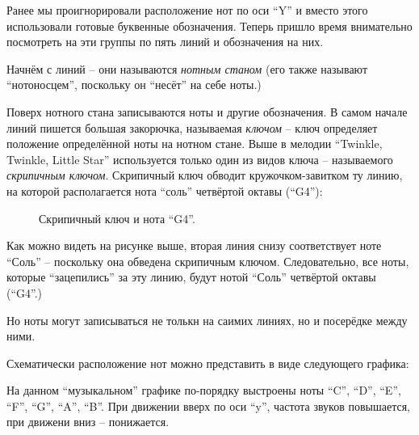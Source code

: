 \documentclass[a4paper,twoside]{book}
\begin{document}
Ранее мы проигнорировали расположение нот по оси ``Y'' и вместо этого
использовали готовые буквенные обозначения. Теперь пришло время внимательно
посмотреть на эти группы по пять линий и обозначения на них.

Начнём с линий -- они называются \emph{нотным станом} (его также называют
``нотоносцем'', поскольку он ``несёт'' на себе ноты.)

Поверх нотного стана записываются ноты и другие обозначения. В самом начале
линий пишется большая закорючка, называемая \emph{ключом} -- ключ определяет
положение определённой ноты на нотном стане. Выше в мелодии ``Twinkle, Twinkle,
Little Star'' используется только один из видов ключа -- называемого
\emph{скрипичным ключом}. Скрипичный ключ обводит кружочком-завитком ту линию,
на которой располагается нота ``соль'' четвёртой октавы (``G4''):

\begin{figure}[ht]
  \caption{Скрипичный ключ и нота ``G4''.}
  \centering
  \label{fig:lilypond-clef-example}
\end{figure}

Как можно видеть на рисунке выше, вторая линия снизу соответствует ноте ``Соль''
-- поскольку она обведена скрипичным ключом. Следовательно, все ноты, которые
``зацепились'' за эту линию, будут нотой ``Соль'' четвёртой октавы (``G4''.)

Но ноты могут записываться не толькн на саимих линиях, но и посерёдке между
ними.

Схематически расположение нот можно представить в виде следующего графика:


На данном ``музыкальном'' графике по-порядку выстроены ноты ``C'', ``D'', ``E'',
``F'', ``G'', ``A'', ``B''. При движении вверх по оси ``y'', частота звуков
повышается, при движени вниз -- понижается.
\end{document}
